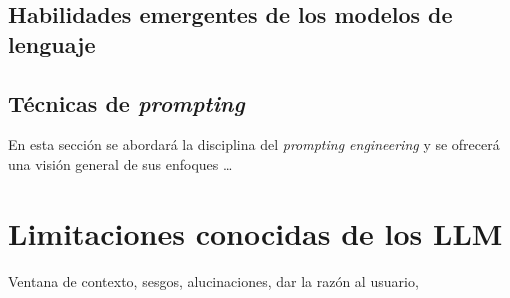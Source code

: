 \subsection{Habilidades emergentes de los modelos de lenguaje}
\subsection{Técnicas de \textit{prompting}}
\label{sec:llm_tecnicas_prompting}
En esta sección se abordará la disciplina del \textit{prompting engineering} y se ofrecerá una visión general de sus enfoques \citep{LLMPromptingGuide}\dots


\section{Limitaciones conocidas de los LLM}
Ventana de contexto, sesgos, alucinaciones, dar la razón al usuario, 










